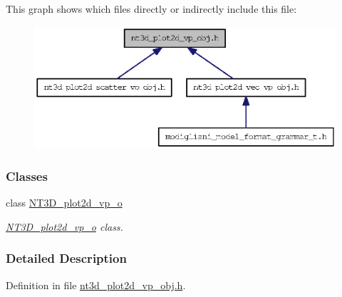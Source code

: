 This graph shows which files directly or indirectly include this file:
\nopagebreak
\begin{figure}[H]
\begin{center}
\leavevmode
\includegraphics[width=393pt]{nt3d__plot2d__vp__obj_8h__dep__incl}
\end{center}
\end{figure}
\subsubsection*{Classes}
\begin{DoxyCompactItemize}
\item 
class \hyperlink{class_n_t3_d__plot2d__vp__o}{NT3D\_\-plot2d\_\-vp\_\-o}
\begin{DoxyCompactList}\small\item\em \hyperlink{class_n_t3_d__plot2d__vp__o}{NT3D\_\-plot2d\_\-vp\_\-o} class. \item\end{DoxyCompactList}\end{DoxyCompactItemize}


\subsubsection{Detailed Description}


Definition in file \hyperlink{nt3d__plot2d__vp__obj_8h_source}{nt3d\_\-plot2d\_\-vp\_\-obj.h}.

